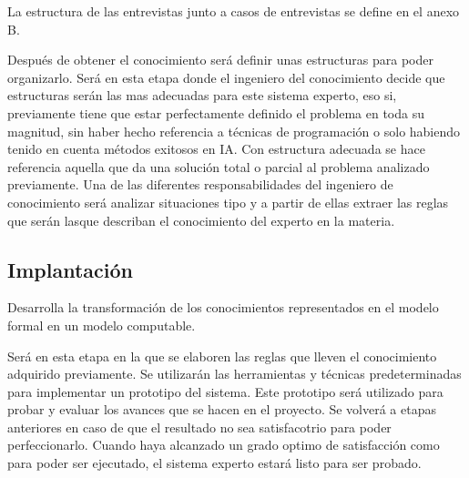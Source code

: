 La estructura de las entrevistas junto a casos de entrevistas se define en el anexo B.

Después de obtener el conocimiento será definir unas estructuras para poder organizarlo.
 Será en esta etapa donde el ingeniero del conocimiento decide que estructuras serán
 las mas adecuadas para este sistema experto, eso si, previamente tiene que estar perfectamente
 definido el problema en toda su magnitud, sin haber hecho referencia a técnicas de programación
 o solo habiendo tenido en cuenta métodos exitosos en IA. Con estructura adecuada se hace referencia
 aquella que da una solución total o parcial al problema analizado previamente. Una de las
 diferentes responsabilidades del ingeniero de conocimiento será analizar situaciones tipo y
 a partir de ellas extraer las reglas que serán lasque describan el conocimiento del experto
 en la materia.



\subsection{Implantación}

Desarrolla la transformación de los conocimientos representados en el modelo formal
 en un modelo computable.

Será en esta etapa en la que se elaboren las reglas que lleven el conocimiento adquirido
 previamente. Se utilizarán las herramientas y técnicas predeterminadas para implementar
 un prototipo del sistema. Este prototipo será utilizado para probar y evaluar los avances
 que se hacen en el proyecto. Se volverá a etapas anteriores en caso de que el resultado
 no sea satisfacotrio para poder perfeccionarlo. Cuando haya alcanzado un grado optimo
 de satisfacción como para poder ser ejecutado, el sistema experto estará listo para ser probado.

